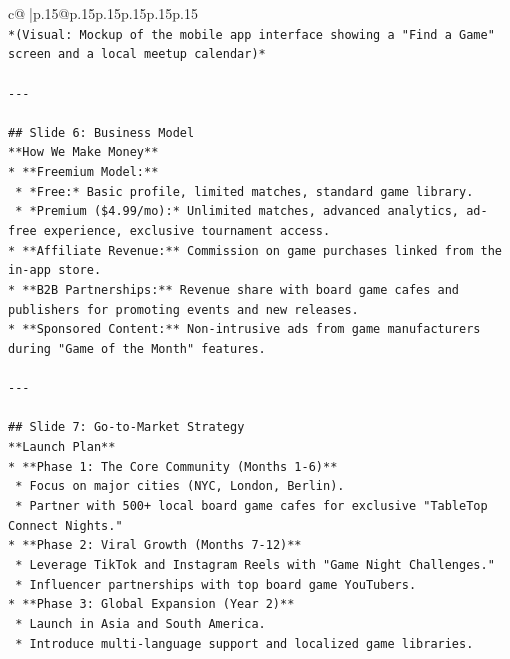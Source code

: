 \documentclass{article}
\begin{document}
{\begin{supertabular}{c@{$\;$}|p{.15\linewidth}@{}p{.15\linewidth}p{.15\linewidth}p{.15\linewidth}p{.15\linewidth}p{.15\linewidth}}
{{{\\ 
\texttt{*(Visual: Mockup of the mobile app interface showing a "Find a Game" screen and a local meetup calendar)*} \\
\\ 
\texttt{{-}{-}{-}} \\
\\ 
\texttt{\#\# Slide 6: Business Model} \\
\texttt{**How We Make Money**} \\
\texttt{*   **Freemium Model:**} \\
\texttt{    *   *Free:* Basic profile, limited matches, standard game library.} \\
\texttt{    *   *Premium (\$4.99/mo):* Unlimited matches, advanced analytics, ad{-}free experience, exclusive tournament access.} \\
\texttt{*   **Affiliate Revenue:** Commission on game purchases linked from the in{-}app store.} \\
\texttt{*   **B2B Partnerships:** Revenue share with board game cafes and publishers for promoting events and new releases.} \\
\texttt{*   **Sponsored Content:** Non{-}intrusive ads from game manufacturers during "Game of the Month" features.} \\
\\ 
\texttt{{-}{-}{-}} \\
\\ 
\texttt{\#\# Slide 7: Go{-}to{-}Market Strategy} \\
\texttt{**Launch Plan**} \\
\texttt{*   **Phase 1: The Core Community (Months 1{-}6)**} \\
\texttt{    *   Focus on major cities (NYC, London, Berlin).} \\
\texttt{    *   Partner with 500+ local board game cafes for exclusive "TableTop Connect Nights."} \\
\texttt{*   **Phase 2: Viral Growth (Months 7{-}12)**} \\
\texttt{    *   Leverage TikTok and Instagram Reels with "Game Night Challenges."} \\
\texttt{    *   Influencer partnerships with top board game YouTubers.} \\
\texttt{*   **Phase 3: Global Expansion (Year 2)**} \\
\texttt{    *   Launch in Asia and South America.} \\
\texttt{    *   Introduce multi{-}language support and localized game libraries.} \\
}}}
\end{supertabular}}
\end{document}

